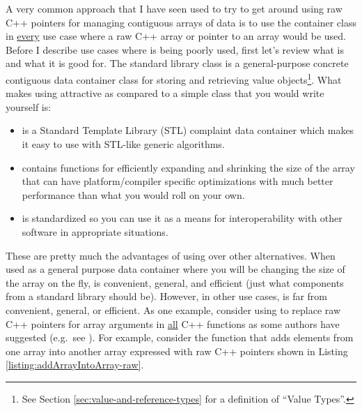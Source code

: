 \documentclass[pdf,ps2pdf,11pt]{SANDreport}
\begin{document}
A very common approach that I have seen used to try to get around
using raw C++ pointers for managing contiguous arrays of data is to
use the container class {} in {}\underline{every} use
case where a raw C++ array or pointer to an array would be used.
Before I describe use cases where {} is being poorly
used, first let's review what {} is and what it is
good for.  The standard library class {} is a
general-purpose concrete contiguous data container class for storing
and retrieving value objects\footnote{See Section
{}\ref{sec:value-and-reference-types} for a definition of ``Value
Types''.}.  What makes using {} attractive as
compared to a simple class that you would write yourself is:

\begin{itemize}

{}\item{} is a Standard Template Library (STL)
complaint data container which makes it easy to use with STL-like
generic algorithms.

{}\item{} contains functions for efficiently
expanding and shrinking the size of the array that can have
platform/compiler specific optimizations with much better performance
than what you would roll on your own.

{}\item{} is standardized so you can use it as a
means for interoperability with other software in appropriate
situations.

\end{itemize}

These are pretty much the advantages of using {} over
other alternatives.  When used as a general purpose data container
where you will be changing the size of the array on the fly,
{} is convenient, general, and efficient (just what
components from a standard library should be).  However, in other use
cases, {} is far from convenient, general, or
efficient.  As one example, consider using {} to
replace raw C++ pointers for array arguments in {}\underline{all} C++
functions as some authors have suggested (e.g.\ see
{}\cite{Modernizing-the-C++-Interface-to-MPI}).  For example, consider
the function that adds elements from one array into another array
expressed with raw C++ pointers shown in Listing
{}\ref{listing:addArrayIntoArray-raw}.
\end{document}
